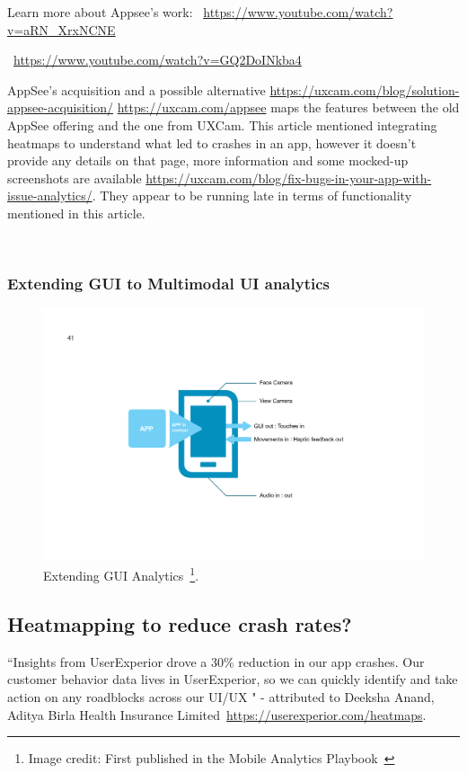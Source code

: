 Learn more about Appsee's work: ~\url{https://www.youtube.com/watch?v=aRN_XrxNCNE}

~\url{https://www.youtube.com/watch?v=GQ2DoINkba4}

AppSee's acquisition and a possible alternative \url{https://uxcam.com/blog/solution-appsee-acquisition/} \url{https://uxcam.com/appsee} maps the features between the old AppSee offering and the one from UXCam. This article mentioned integrating heatmaps to understand what led to crashes in an app, however it doesn't provide any details on that page, more information and some mocked-up screenshots are available \url{https://uxcam.com/blog/fix-bugs-in-your-app-with-issue-analytics/}. They appear to be running late in terms of functionality mentioned in this article. 

~\subsubsection{Extending GUI to Multimodal UI analytics}

\begin{figure}[htbp!]
    \begin{minipage}{\textwidth}
    \centering
    \includegraphics[width=15cm]{images/mobile-analytics-playbook/Chart-11-extending-gui-analytics.png}
    \caption[Extending GUI Analytics]{Extending GUI Analytics~\footnote{Image credit: First published in the Mobile Analytics Playbook~\cite{harty_aymer_playbook_2016}}.}
    \label{fig:extending-gui-analytics}
    \end{minipage}
\end{figure}

\subsection{Heatmapping to reduce crash rates?}
``Insights from UserExperior drove a 30\% reduction in our app crashes. Our customer behavior data lives in UserExperior, so we can quickly identify and take action on any roadblocks across our UI/UX " - attributed to Deeksha Anand, Aditya Birla Health Insurance Limited~\url{https://userexperior.com/heatmaps}. 

